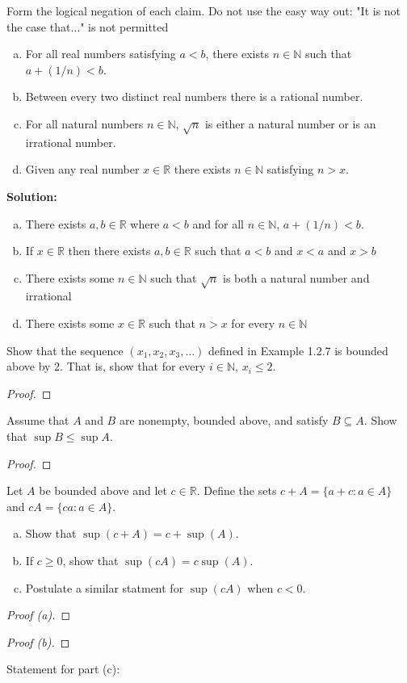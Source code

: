 \documentclass[12pt]{article}
\makeatletter
\theoremstyle{homework}
\newenvironment{exercise}[1]
{\def\@currentlabel{#1}\exercisecore}
{\endexercisecore}
\newcommand{\localhead}[1]{\par\smallskip\noindent\textbf{#1}\nobreak\\}%
\newcommand\solution{\localhead{Solution:}}
\newcommand{\Reals}{\ensuremath{\mathbb R}}
\newcommand{\Nats}{\ensuremath{\mathbb N}}
\let\RR\Reals
\makeatother
\begin{document}
\begin{exercise}{1.2.8}
Form the logical negation of each claim. Do not use the easy way out: "It is not the case that$\ldots$" 
is not permitted
\begin{enumerate}[(a)]
\item For all real numbers satisfying $a<b$, there exists $n\in\Nats$ such that $a+(1/n)<b$.
\item Between every two distinct real numbers there is a rational number.
\item For all natural numbers $n\in\Nats$, $\sqrt{n}$ is either a natural number or is an
irrational number.
\item Given any real number $x\in\Reals$ there exists $n\in\Nats$ satisfying $n>x$.
\end{enumerate}
\end{exercise}
\solution
\begin{enumerate}[(a)]
\item There exists $a,b \in \RR$ where $a<b$ and for all $n \in \Nats$, $a+(1/n)<b$.
\item If $x \in \RR$ then there exists $a,b \in \RR$ such that $a<b$ and $x < a$ and $x > b$ 
\item There exists some $n \in \Nats$ such that $\sqrt {n}$ is both a natural number and irrational
\item There exists some $x \in \RR$ such that $n>x$ for every $n \in \Nats$
\end{enumerate}

\begin{exercise}{1.2.9} Show that the sequence $(x_1, x_2, x_3,\ldots)$ defined in Example
1.2.7 is bounded above by 2.  That is, show that for every $i\in\Nats$, $x_i\le 2$.
\end{exercise}
\begin{proof}
\end{proof}

\begin{exercise}{1.3.4}
Assume that $A$ and $B$ are nonempty, bounded above, and satisfy $B\subseteq A$.
Show that $\sup B \le \sup A$.
\end{exercise}
\begin{proof}
\end{proof}

\begin{exercise}{1.3.5}  Let $A$ be bounded above and let $c\in\Reals$.
Define the sets $c+A = \{a+c:a\in A\}$ and $cA = \{ca:a\in A\}$.
\begin{enumerate}[(a)]
\item Show that $\sup(c+A) = c + \sup(A)$.
\item If $c\ge 0$, show that $\sup(cA) = c\sup(A)$.
\item Postulate a similar statment for $\sup(cA)$ when $c<0$.
\end{enumerate}
\end{exercise}
\begin{proof}[Proof (a)]
\end{proof}
\begin{proof}[Proof (b)]
\end{proof}
Statement for part (c): 
\end{document}
